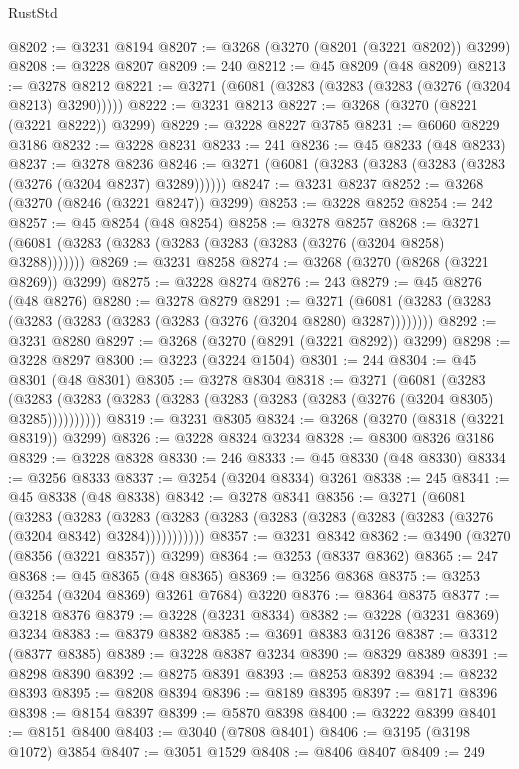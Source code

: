 \begin{lexlean}{RustStd}
\begin{coremodule}
@8202 := @3231 @8194
@8207 := @3268 (@3270 (@8201 (@3221 @8202)) @3299)
@8208 := @3228 @8207
@8209 := 240
@8212 := @45 @8209 (@48 @8209)
@8213 := @3278 @8212
@8221 := @3271 (@6081 (@3283 (@3283 (@3283 (@3276 (@3204 @8213) @3290)))))
@8222 := @3231 @8213
@8227 := @3268 (@3270 (@8221 (@3221 @8222)) @3299)
@8229 := @3228 @8227 @3785
@8231 := @6060 @8229 @3186
@8232 := @3228 @8231
@8233 := 241
@8236 := @45 @8233 (@48 @8233)
@8237 := @3278 @8236
@8246 := @3271 (@6081 (@3283 (@3283 (@3283 (@3283 (@3276 (@3204 @8237) @3289))))))
@8247 := @3231 @8237
@8252 := @3268 (@3270 (@8246 (@3221 @8247)) @3299)
@8253 := @3228 @8252
@8254 := 242
@8257 := @45 @8254 (@48 @8254)
@8258 := @3278 @8257
@8268 := @3271 (@6081 (@3283 (@3283 (@3283 (@3283 (@3283 (@3276 (@3204 @8258) @3288)))))))
@8269 := @3231 @8258
@8274 := @3268 (@3270 (@8268 (@3221 @8269)) @3299)
@8275 := @3228 @8274
@8276 := 243
@8279 := @45 @8276 (@48 @8276)
@8280 := @3278 @8279
@8291 := @3271 (@6081 (@3283 (@3283 (@3283 (@3283 (@3283 (@3283 (@3276 (@3204 @8280) @3287))))))))
@8292 := @3231 @8280
@8297 := @3268 (@3270 (@8291 (@3221 @8292)) @3299)
@8298 := @3228 @8297
@8300 := @3223 (@3224 @1504)
@8301 := 244
@8304 := @45 @8301 (@48 @8301)
@8305 := @3278 @8304
@8318 := @3271
    (@6081
      (@3283 (@3283 (@3283 (@3283 (@3283 (@3283 (@3283 (@3283 (@3276 (@3204 @8305) @3285))))))))))
@8319 := @3231 @8305
@8324 := @3268 (@3270 (@8318 (@3221 @8319)) @3299)
@8326 := @3228 @8324 @3234
@8328 := @8300 @8326 @3186
@8329 := @3228 @8328
@8330 := 246
@8333 := @45 @8330 (@48 @8330)
@8334 := @3256 @8333
@8337 := @3254 (@3204 @8334) @3261
@8338 := 245
@8341 := @45 @8338 (@48 @8338)
@8342 := @3278 @8341
@8356 := @3271
    (@6081
      (@3283
        (@3283
          (@3283 (@3283 (@3283 (@3283 (@3283 (@3283 (@3283 (@3276 (@3204 @8342) @3284)))))))))))
@8357 := @3231 @8342
@8362 := @3490 (@3270 (@8356 (@3221 @8357)) @3299)
@8364 := @3253 (@8337 @8362)
@8365 := 247
@8368 := @45 @8365 (@48 @8365)
@8369 := @3256 @8368
@8375 := @3253 (@3254 (@3204 @8369) @3261 @7684) @3220
@8376 := @8364 @8375
@8377 := @3218 @8376
@8379 := @3228 (@3231 @8334)
@8382 := @3228 (@3231 @8369) @3234
@8383 := @8379 @8382
@8385 := @3691 @8383 @3126
@8387 := @3312 (@8377 @8385)
@8389 := @3228 @8387 @3234
@8390 := @8329 @8389
@8391 := @8298 @8390
@8392 := @8275 @8391
@8393 := @8253 @8392
@8394 := @8232 @8393
@8395 := @8208 @8394
@8396 := @8189 @8395
@8397 := @8171 @8396
@8398 := @8154 @8397
@8399 := @5870 @8398
@8400 := @3222 @8399
@8401 := @8151 @8400
@8403 := @3040 (@7808 @8401)
@8406 := @3195 (@3198 @1072) @3854
@8407 := @3051 @1529
@8408 := @8406 @8407
@8409 := 249

\end{coremodule}
\end{lexlean}
